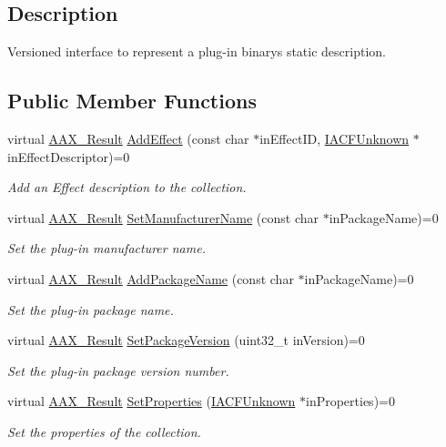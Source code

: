 \subsection{Description}
Versioned interface to represent a plug-\/in binary\textquotesingle{}s static description. \subsection*{Public Member Functions}
\begin{DoxyCompactItemize}
\item 
virtual \hyperlink{a00149_a4d8f69a697df7f70c3a8e9b8ee130d2f}{A\+A\+X\+\_\+\+Result} \hyperlink{a00049_a0fdba73ff6279df807ceac3486ab7630}{Add\+Effect} (const char $\ast$in\+Effect\+I\+D, \hyperlink{a00146}{I\+A\+C\+F\+Unknown} $\ast$in\+Effect\+Descriptor)=0
\begin{DoxyCompactList}\small\item\em Add an Effect description to the collection. \end{DoxyCompactList}\item 
virtual \hyperlink{a00149_a4d8f69a697df7f70c3a8e9b8ee130d2f}{A\+A\+X\+\_\+\+Result} \hyperlink{a00049_af3758a6741780e575fa36b95e9716072}{Set\+Manufacturer\+Name} (const char $\ast$in\+Package\+Name)=0
\begin{DoxyCompactList}\small\item\em Set the plug-\/in manufacturer name. \end{DoxyCompactList}\item 
virtual \hyperlink{a00149_a4d8f69a697df7f70c3a8e9b8ee130d2f}{A\+A\+X\+\_\+\+Result} \hyperlink{a00049_ae8087ce7d0b9c4d1d2e6d14616a67208}{Add\+Package\+Name} (const char $\ast$in\+Package\+Name)=0
\begin{DoxyCompactList}\small\item\em Set the plug-\/in package name. \end{DoxyCompactList}\item 
virtual \hyperlink{a00149_a4d8f69a697df7f70c3a8e9b8ee130d2f}{A\+A\+X\+\_\+\+Result} \hyperlink{a00049_a4276dc11c5036797a75a66fd49e12839}{Set\+Package\+Version} (uint32\+\_\+t in\+Version)=0
\begin{DoxyCompactList}\small\item\em Set the plug-\/in package version number. \end{DoxyCompactList}\item 
virtual \hyperlink{a00149_a4d8f69a697df7f70c3a8e9b8ee130d2f}{A\+A\+X\+\_\+\+Result} \hyperlink{a00049_a413165097cbab9087294a694d52cf12a}{Set\+Properties} (\hyperlink{a00146}{I\+A\+C\+F\+Unknown} $\ast$in\+Properties)=0
\begin{DoxyCompactList}\small\item\em Set the properties of the collection. \end{DoxyCompactList}\end{DoxyCompactItemize}


